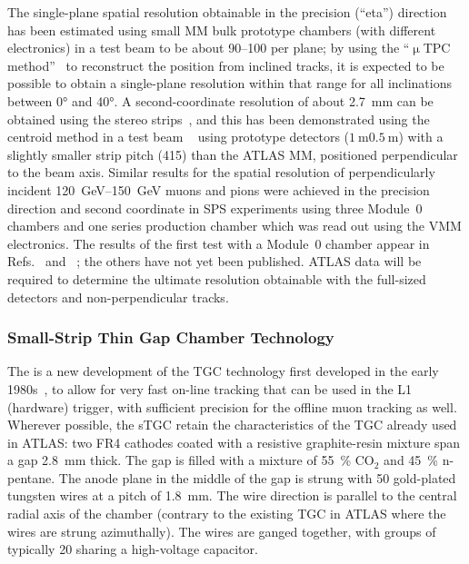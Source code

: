\documentclass[cernpreprint, atlasdraft=false, UKenglish,british,orcidlogo, texmf, orcidlogo]{atlasdoc}
\begin{document}
The single-plane spatial resolution obtainable in the precision (``eta'') direction has been estimated using small \gls{MM} bulk prototype chambers (with different electronics) in a test beam to be about \SIrange{90}{100}{\micron} per plane; by using the ``$\upmu$TPC method''~\cite{ALEXOPOULOS2019125} to reconstruct the position from inclined tracks, it is expected to be possible to obtain a single-plane resolution within that range for all inclinations between \ang{0} and \ang{40}.
A second-coordinate resolution of about \SI{2.7}{\mm} can be obtained using the stereo strips~\cite{ATL-MUON-PUB-2015-001},
and this has been demonstrated using the centroid method in a test beam
~\cite{KNtekas}
using prototype detectors ($\SI{1}{\m}\SI{0.5}{\m}$) with a slightly smaller strip pitch (\SI{415}{\micron}) than the ATLAS \gls{MM}, positioned perpendicular to the beam axis.
Similar results for the spatial resolution of perpendicularly incident \SIrange{120}{150}{\GeV} muons and pions were achieved in the precision direction and second coordinate in \gls{SPS} experiments using three Module~0 chambers  and one series production chamber which was read out using the \gls{VMM} electronics. The results of the first test with a Module~0 chamber appear in Refs.~\cite{Iodice:2017Kt} and ~\cite{ALEXOPOULOS2020162086}; the others have not yet been published.
\RunThr ATLAS data will be required to determine the ultimate resolution obtainable with the full-sized detectors and non-perpendicular tracks.
 
\subsubsection{Small-Strip Thin Gap Chamber Technology \label{muonSS:sTGC}} 
The  is a new development of the \gls{TGC} technology first developed in the early 1980s~\cite{MAJEWSKI1983265}, to allow for very fast on-line tracking that can be used in the \gls{L1} (hardware) trigger, with sufficient precision for the offline muon tracking as well.
Wherever possible, the \gls{sTGC} retain the characteristics of the \gls{TGC} already used in ATLAS: two \gls{FR4} cathodes coated with a resistive graphite-resin mixture span a gap \SI{2.8}{\mm} thick.
The gap is filled with a mixture of \SI{55}{\percent} CO$_2$ and \SI{45}{\percent} n-pentane.
The anode plane in the middle of the gap is strung with \SI{50}{\micron} gold-plated tungsten wires at a pitch of \SI{1.8}{\mm}.
The wire direction is parallel to the central radial axis of the chamber (contrary to the existing \gls{TGC} in ATLAS where the wires are strung azimuthally).
The wires are ganged together, with groups of typically \num{20} sharing a high-voltage capacitor.
 
\end{document}

